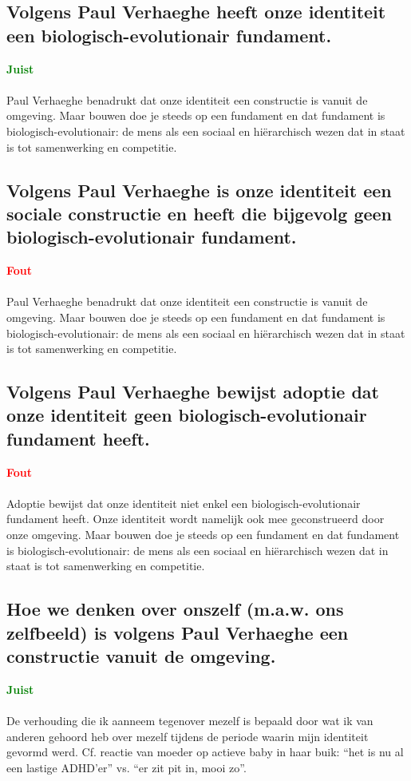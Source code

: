\documentclass[11pt,a4paper,titlepage]{article}
\begin{document}
\subsection{Volgens Paul Verhaeghe heeft onze identiteit een biologisch-evolutionair fundament.}
\textcolor{green}{\textbf{Juist}}\\\\
Paul Verhaeghe benadrukt dat onze identiteit een constructie is vanuit de omgeving. Maar bouwen doe je steeds op een fundament en dat fundament is biologisch-evolutionair: de mens als een sociaal en hiërarchisch wezen dat in staat is tot samenwerking en competitie.

\subsection{Volgens Paul Verhaeghe is onze identiteit een sociale constructie en heeft die bijgevolg geen biologisch-evolutionair fundament.}
\textcolor{red}{\textbf{Fout}}\\\\
Paul Verhaeghe benadrukt dat onze identiteit een constructie is vanuit de omgeving. Maar bouwen doe je steeds op een fundament en dat fundament is biologisch-evolutionair: de mens als een sociaal en hiërarchisch wezen dat in staat is tot samenwerking en competitie.

\subsection{Volgens Paul Verhaeghe bewijst adoptie dat onze identiteit geen biologisch-evolutionair fundament heeft.}
\textcolor{red}{\textbf{Fout}}\\\\
Adoptie bewijst dat onze identiteit niet enkel een biologisch-evolutionair fundament heeft. Onze identiteit wordt namelijk ook mee geconstrueerd door onze omgeving. Maar bouwen doe je steeds op een fundament en dat fundament is biologisch-evolutionair: de mens als een sociaal en hiërarchisch wezen dat in staat is tot samenwerking en competitie.

\subsection{Hoe we denken over onszelf (m.a.w. ons zelfbeeld) is volgens Paul Verhaeghe een constructie vanuit de omgeving.}
\textcolor{green}{\textbf{Juist}}\\\\
De verhouding die ik aanneem tegenover mezelf is bepaald door wat ik van anderen gehoord heb over mezelf tijdens de periode waarin mijn identiteit gevormd werd. Cf. reactie van moeder op actieve baby in haar buik: “het is nu al een lastige ADHD’er” vs. “er zit pit in, mooi zo”.
\end{document}
